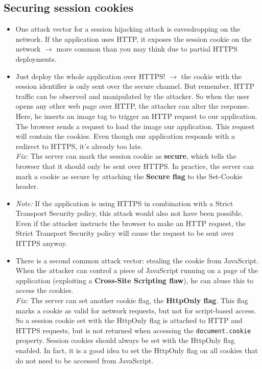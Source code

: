 \documentclass[../main.tex]{subfiles}
\begin{document}
\subsection{Securing session cookies}
\begin{itemize}
\item One attack vector for a session hijacking attack is eavesdropping on the network. If the application uses HTTP, it exposes the session cookie on the network $\rightarrow$ more common than you may think due to partial HTTPS deployments.
\item Just deploy the whole application over HTTPS! $\rightarrow$ the cookie with the session identifier is only sent over the secure channel. But remember, HTTP traffic can be observed and manipulated by the attacker. So when the user opens any other web page over HTTP, the attacker can alter the response. Here, he inserts an image tag to trigger an HTTP request to our application. The browser sends a request to load the image our application. This request will contain the cookies. Even though our application responds with a redirect to HTTPS, it’s already too late.\\
\emph{Fix:} The server can mark the session cookie as \textbf{secure}, which tells the browser that it should only be sent over HTTPS. In practice, the server can mark a cookie as secure by attaching the \textbf{Secure flag} to the Set-Cookie header.
\item \emph{Note:} If the application is using HTTPS in combination with a Strict Transport Security policy, this attack would also not have been possible. Even if the attacker instructs the browser to make an HTTP request, the Strict Transport Security policy will cause the request to be sent over HTTPS anyway.
\item There is a second common attack vector: stealing the cookie from JavaScript. When the attacker can control a piece of JavaScript running on a page of the application (exploiting a \textbf{Cross-Site Scripting flaw}), he can abuse this to access the cookies.\\
\emph{Fix:} The server can set another cookie flag, the \textbf{HttpOnly flag}. This flag marks a cookie as valid for network requests, but not for script-based access. So a session cookie set with the HttpOnly flag is attached to HTTP and HTTPS requests, but is not returned when accessing the \texttt{document.cookie} property. Session cookies should always be set with the HttpOnly flag enabled. In fact, it is a good idea to set the HttpOnly flag on all cookies that do not need to be accessed from JavaScript.
\end{itemize}
\end{document}
